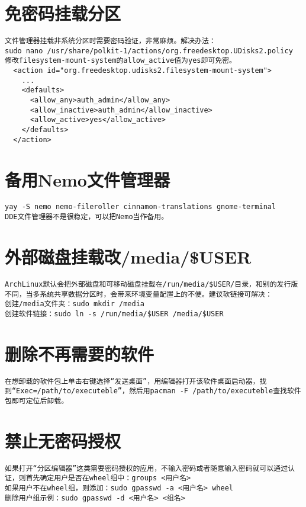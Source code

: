 \documentclass[a4paper,fontset=fandol,zihao=-4,linespread=1.2]{ctexbook}
\begin{document}
\section{免密码挂载分区} \label{section:nopass_mount}
\begin{lstlisting}
文件管理器挂载非系统分区时需要密码验证，非常麻烦。解决办法：
sudo nano /usr/share/polkit-1/actions/org.freedesktop.UDisks2.policy
修改filesystem-mount-system的allow_active值为yes即可免密。
  <action id="org.freedesktop.udisks2.filesystem-mount-system">
    ...
    <defaults>
      <allow_any>auth_admin</allow_any>
      <allow_inactive>auth_admin</allow_inactive>
      <allow_active>yes</allow_active>
    </defaults>
  </action>
\end{lstlisting}

\section{备用Nemo文件管理器}
\begin{lstlisting}
yay -S nemo nemo-fileroller cinnamon-translations gnome-terminal
DDE文件管理器不是很稳定，可以把Nemo当作备用。
\end{lstlisting}

\section{外部磁盘挂载改/media/\$USER}
\begin{lstlisting}
ArchLinux默认会把外部磁盘和可移动磁盘挂载在/run/media/$USER/目录，和别的发行版不同，当多系统共享数据分区时，会带来环境变量配置上的不便。建议软链接可解决：
创建/media文件夹：sudo mkdir /media
创建软件链接：sudo ln -s /run/media/$USER /media/$USER
\end{lstlisting}

\section{删除不再需要的软件}
\begin{lstlisting}
在想卸载的软件包上单击右键选择“发送桌面”，用编辑器打开该软件桌面启动器，找到“Exec=/path/to/executeble”，然后用pacman -F /path/to/executeble查找软件包即可定位后卸载。
\end{lstlisting}

\section{禁止无密码授权}
\begin{lstlisting}
如果打开“分区编辑器”这类需要密码授权的应用，不输入密码或者随意输入密码就可以通过认证，则首先确定用户是否在wheel组中：groups <用户名>
如果用户不在wheel组，则添加：sudo gpasswd -a <用户名> wheel
删除用户组示例：sudo gpasswd -d <用户名> <组名>
\end{lstlisting}
\end{document}
